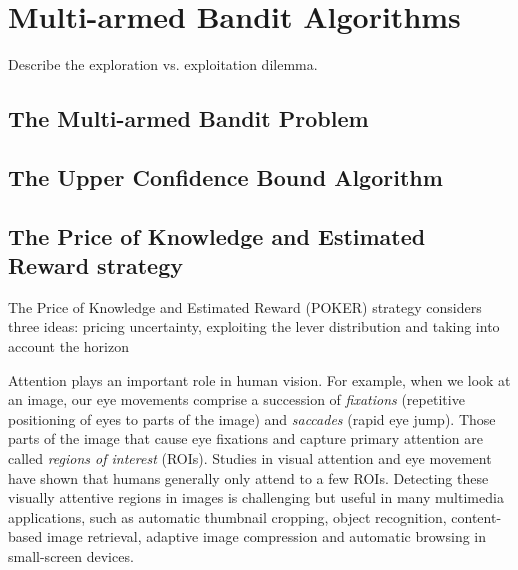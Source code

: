 \chapter{Multi-armed Bandit Algorithms}
\label{c:bandit}

Describe the exploration vs. exploitation dilemma.

\section{The Multi-armed Bandit Problem}


\section{The Upper Confidence Bound Algorithm}


\section{The Price of Knowledge and Estimated Reward strategy}
The Price of Knowledge and Estimated Reward (POKER) strategy considers three ideas: pricing uncertainty, exploiting the lever distribution and taking into account the horizon


Attention plays an important role in human vision. For example, when
we look at an image, our eye movements comprise a succession of {\em
fixations} (repetitive positioning of eyes to parts of the image)
and {\em saccades} (rapid eye jump). Those parts of the image that
cause eye fixations and capture primary attention are called {\em
regions of interest} (ROIs). Studies in visual attention and eye
movement have shown that humans generally only attend to a few ROIs.
Detecting these visually attentive regions in images is challenging
but useful in many multimedia applications, such as automatic
thumbnail cropping, object recognition, content-based image
retrieval, adaptive image compression and automatic browsing in
small-screen devices.

